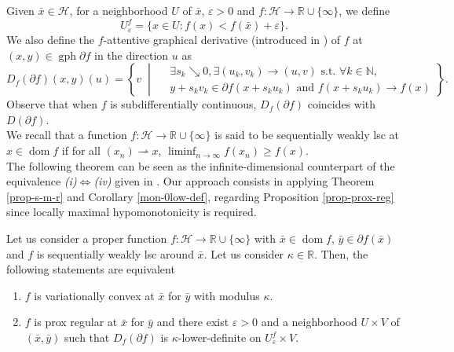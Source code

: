 \documentclass[smallextended,envcountsect,envcountsame]{svjour3}
\newcounter{count}
\renewcommand{\H}{\mathcal{H}}
\newcommand{\R}{\mathbb{R}}
\newcommand{\N}{\mathbb{N}}
\newcommand{\gph}{\operatorname{gph}}
\newcommand{\dom}{\operatorname{dom}}
\renewcommand{\epsilon}{\varepsilon}
\newcommand{\1}{\mathds{1}}
\begin{document}
	Given $\bar x\in \H$, for a neighborhood $U$ of $\bar x$, $\epsilon >0$ and $f\colon \H\to\R\cup\{\infty\}$, we define $$U_\epsilon^f = \{x\in U : f(x)<f(\bar x) + \epsilon\}.$$
	We also define the $f$-attentive graphical derivative (introduced in \cite{gfrerer2025}) of $f$ at $(x,y)\in \gph \partial f$ in the direction $u$ as
\begin{equation*}
D_f(\partial f)(x,y)(u) =\left\{
  v \;\middle|\;
  \begin{aligned}
  & \exists s_k\searrow 0, \exists (u_k,v_k)\to (u,v) \text{ s.t. }\forall k\in\N,\\
  & y+s_kv_k\in \partial f(x+s_ku_k) \text{ and } f(x+s_k u_k)\to f(x)
  \end{aligned}
\right\}.
\end{equation*}
Observe that when $f$ is subdifferentially continuous, $D_f(\partial f)$ coincides with $D(\partial f)$.\\
We recall that a function $f\colon \H\to \R\cup\{\infty\}$ is said to be sequentially weakly lsc at $x\in \dom f$ if for all $(x_n)\rightharpoonup x$, $\liminf_{n\to \infty} f(x_n)\geq f(x)$.\\
The following theorem can be seen as the infinite-dimensional counterpart of the equivalence \emph{(i)}$\iff$\emph{(iv)} given in \cite[Theorem 4.3]{gfrerer2025}. Our approach consists in applying Theorem \ref{prop-s-m-r} and Corollary \ref{mon-0low-def}, regarding Proposition \ref{prop-prox-reg} since locally maximal hypomonotonicity is required.
	\begin{theorem}\label{char-var-convex}
		Let us consider a proper function $f\colon \H\to \R\cup\{\infty\}$ with $\bar x\in\dom f$, $\bar y\in \partial f(\bar x)$ and $f$ is sequentially weakly lsc around $\bar x$. Let us consider $\kappa\in\R$. Then, the following statements are equivalent 
		\begin{enumerate}
			\item [(a)] $f$ is variationally convex at $\bar x$ for $\bar y$ with modulus $\kappa$.
			\item [(b)] $f$ is prox regular at $\bar x$ for $\bar y$ and there exist $\epsilon>0$ and a neighborhood $U\times V$ of $(\bar x,\bar y)$ such that $D_f(\partial f)$ is $\kappa$-lower-definite on $U_\epsilon^f\times V$.
		\end{enumerate}
	\end{theorem}
	
\end{document}

